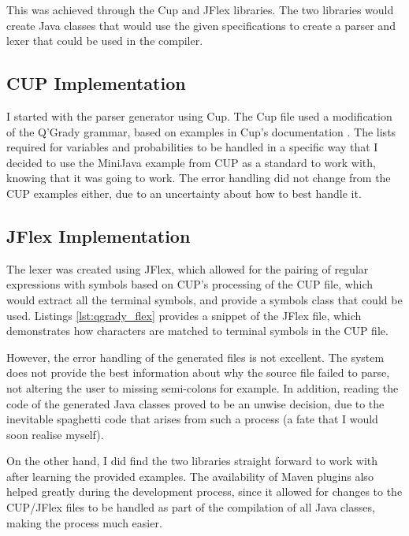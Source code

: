 \documentclass[report.tex]{subfiles}
\begin{document}
This was achieved through the Cup and JFlex libraries. The two libraries would
create Java classes that would use the given specifications to create a parser
and lexer that could be used in the compiler.

\subsection{CUP Implementation} %
\label{sub:cup_impl}
I started with the parser generator using Cup. The Cup file used a modification
of the Q'Grady grammar, based on examples in Cup's documentation 
\cite{cup_example}. The lists required for variables and probabilities to be
handled in a specific way that I decided to use the MiniJava example from CUP
as a standard to work with, knowing that it was going to work. The error
handling did not change from the CUP examples either, due to an uncertainty
about how to best handle it.

\subsection{JFlex Implementation} %
\label{sub:jflex_impl}
The lexer was created using JFlex, which allowed for the pairing of regular
expressions with symbols based on CUP's processing of the CUP file, which would
extract all the terminal symbols, and provide a symbols class that could be
used. Listings \ref{lst:qgrady_flex} provides a snippet of the JFlex file, which
demonstrates how characters are matched to terminal symbols in the CUP file.

 


However, the error handling of the generated files is not excellent. The system
does not provide the best information about why the source file failed to parse,
not altering the user to missing semi-colons for example. In addition, reading
the code of the generated Java classes proved to be an unwise decision, due to
the inevitable spaghetti code that arises from such a process (a fate that I
would soon realise myself).

On the other hand, I did find the two libraries straight forward to work with
after learning the provided examples. The availability of Maven plugins also
helped greatly during the development process, since it allowed for changes to
the CUP/JFlex files to be handled as part of the compilation of all Java
classes, making the process much easier.
\end{document}
